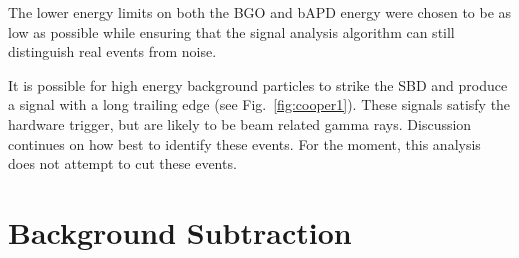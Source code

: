 \documentclass[oneside,12pt]{memoir}
\begin{document}
The lower energy limits on both the BGO and bAPD energy were chosen to be as low as possible while ensuring that the signal analysis algorithm can still distinguish real events from noise.\par
It is possible for high energy background particles to strike the SBD and produce a signal with a long trailing edge (see Fig.~\ref{fig:cooper1}). These signals satisfy the hardware trigger, but are likely to be beam related gamma rays. Discussion continues on how best to identify these events. For the moment, this analysis does not attempt to cut these events.\par

\section{Background Subtraction}
\label{sec:background}
\end{document}
